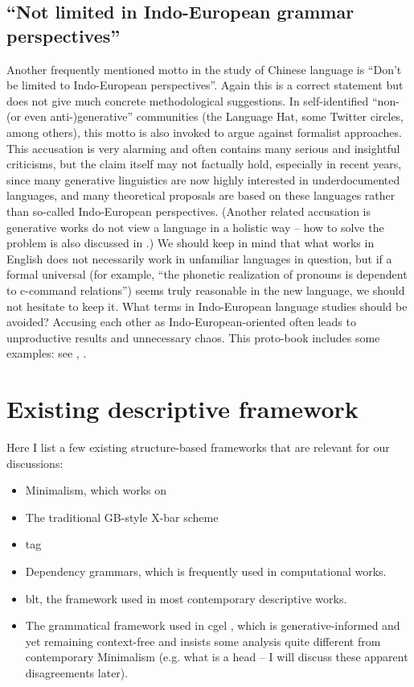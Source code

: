 \documentclass[../main.tex]{subfiles}
\begin{document}
\subsection{``Not limited in Indo-European grammar perspectives''}

Another frequently mentioned motto in the study of Chinese language is ``Don't be limited to Indo-European
perspectives''. Again this is a correct statement but does not give much concrete methodological suggestions.
In self-identified ``non-(or even anti-)generative'' communities (the Language Hat, some Twitter circles, 
among others), this motto is also invoked to argue against formalist approaches. This accusation is very alarming and often contains many serious and insightful criticisms, but the claim itself may not factually 
hold, especially in recent years, since many generative linguistics are now highly interested in
underdocumented languages, and many theoretical proposals \citep{preminger2014agreement} are based on %
these languages rather than so-called Indo-European perspectives. (Another related accusation is 
generative works do not view a language in a holistic way -- how to solve the problem is also 
discussed in .) We should keep in mind 
that what works in English does not necessarily work in unfamiliar languages in question, but if 
a formal universal (for example, ``the phonetic realization of pronouns is dependent to c-command relations'')
seems truly reasonable in the new language, we should not hesitate to keep it.
What terms in Indo-European language studies should be avoided? Accusing each other as Indo-European-oriented 
often leads to unproductive results and unnecessary chaos. This proto-book includes some examples: 
see , . %

\section{Existing descriptive framework}\label{sec:descriptive-framework}

Here I list a few existing structure-based frameworks that are relevant for our discussions:
\begin{itemize}
    \item Minimalism, which works on 
    \item The traditional GB-style X-bar scheme
    \item \ac{tag}  %
    \item Dependency grammars, which is frequently used in computational works.
    \item \ac{blt}, the framework used in most contemporary descriptive works.
    \item The grammatical framework used in \ac{cgel} \citep{cgel,pullum2008expressive}, which is generative-informed and yet remaining 
    context-free and insists some analysis quite different from contemporary Minimalism (e.g. 
    what is a head -- I will discuss these apparent disagreements later).
\end{itemize}
\end{document}
